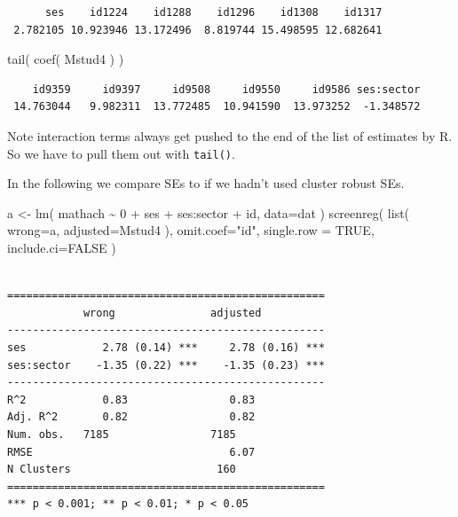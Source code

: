 \documentclass[
  letterpaper,
  DIV=11,
  numbers=noendperiod]{scrreprt}
\newenvironment{Shaded}{}{}
\newcommand{\AttributeTok}[1]{\textcolor[rgb]{0.49,0.56,0.16}{#1}}
\newcommand{\ConstantTok}[1]{\textcolor[rgb]{0.53,0.00,0.00}{#1}}
\newcommand{\DecValTok}[1]{\textcolor[rgb]{0.25,0.63,0.44}{#1}}
\newcommand{\FunctionTok}[1]{\textcolor[rgb]{0.02,0.16,0.49}{#1}}
\newcommand{\NormalTok}[1]{#1}
\newcommand{\OtherTok}[1]{\textcolor[rgb]{0.00,0.44,0.13}{#1}}
\newcommand{\SpecialCharTok}[1]{\textcolor[rgb]{0.25,0.44,0.63}{#1}}
\newcommand{\StringTok}[1]{\textcolor[rgb]{0.25,0.44,0.63}{#1}}
\begin{document}
\begin{verbatim}
      ses    id1224    id1288    id1296    id1308    id1317 
 2.782105 10.923946 13.172496  8.819744 15.498595 12.682641 
\end{verbatim}

\begin{Shaded}
\begin{Highlighting}[]
\FunctionTok{tail}\NormalTok{( }\FunctionTok{coef}\NormalTok{( Mstud4 ) )}
\end{Highlighting}
\end{Shaded}

\begin{verbatim}
    id9359     id9397     id9508     id9550     id9586 ses:sector 
 14.763044   9.982311  13.772485  10.941590  13.973252  -1.348572 
\end{verbatim}

Note interaction terms always get pushed to the end of the list of
estimates by R. So we have to pull them out with \texttt{tail()}.

In the following we compare SEs to if we hadn't used cluster robust SEs.

\begin{Shaded}
\begin{Highlighting}[]
\NormalTok{a }\OtherTok{\textless{}{-}} \FunctionTok{lm}\NormalTok{( mathach }\SpecialCharTok{\textasciitilde{}} \DecValTok{0} \SpecialCharTok{+}\NormalTok{ ses }\SpecialCharTok{+}\NormalTok{ ses}\SpecialCharTok{:}\NormalTok{sector }\SpecialCharTok{+}\NormalTok{ id, }
                    \AttributeTok{data=}\NormalTok{dat )}
\FunctionTok{screenreg}\NormalTok{( }\FunctionTok{list}\NormalTok{( }\AttributeTok{wrong=}\NormalTok{a, }\AttributeTok{adjusted=}\NormalTok{Mstud4 ), }
           \AttributeTok{omit.coef=}\StringTok{"id"}\NormalTok{, }\AttributeTok{single.row =} \ConstantTok{TRUE}\NormalTok{,}
           \AttributeTok{include.ci=}\ConstantTok{FALSE}\NormalTok{ )}
\end{Highlighting}
\end{Shaded}

\begin{verbatim}

==================================================
            wrong               adjusted          
--------------------------------------------------
ses            2.78 (0.14) ***     2.78 (0.16) ***
ses:sector    -1.35 (0.22) ***    -1.35 (0.23) ***
--------------------------------------------------
R^2            0.83                0.83           
Adj. R^2       0.82                0.82           
Num. obs.   7185                7185              
RMSE                               6.07           
N Clusters                       160              
==================================================
*** p < 0.001; ** p < 0.01; * p < 0.05
\end{verbatim}
\end{document}
